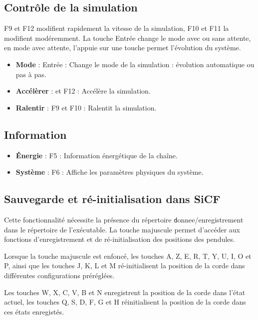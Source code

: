 \subsection{Contrôle de la simulation}
%
{\sf F9} et {\sf F12} modifient rapidement la vitesse de la simulation, {\sf F10} et {\sf F11} la modifient modéremment. La touche {\sf Entrée} change le mode avec ou sans attente, en mode avec attente, l'appuie sur une touche permet l'évolution du système.
%
\begin{itemize}[label=, leftmargin=2cm, itemsep=0pt]
\item {\bf Mode} : {\sf Entrée} : Change le mode de la simulation : évolution automatique ou pas à pas.
\item {\bf Accélèrer} : {} et {\sf F12} : Accélère la simulation.
\item {\bf Ralentir} : {\sf F9} et {\sf F10} : Ralentit la simulation.
\end{itemize}
%
%
\subsection{Information}
\begin{itemize}[label=, leftmargin=2cm, itemsep=0pt]
\item {\bf Énergie} : {\sf F5} : Information énergétique de la chaîne.
\item {\bf Système} : {\sf F6} : Affiche les paramètres physiques du système.
\end{itemize}
%
\subsection{Sauvegarde et ré-initialisation dans SiCF}
%
Cette fonctionnalité nécessite la présence du répertoire {\texttt donnee/enregistrement} dans le répertoire de l'exécutable.
La touche majuscule permet d'accéder aux fonctions d'enregistrement et de ré-initialisation des positions des pendules.

Lorsque la touche majuscule est enfoncé, les touches {\sf A}, {\sf Z}, {\sf E}, {\sf R}, {\sf T}, {\sf Y}, {\sf U}, {\sf I}, {\sf O} et {\sf P}, ainsi que les touches {\sf J}, {\sf K}, {\sf L} et {\sf M} ré-initialisent la position de la corde dans différentes configurations préréglées.

Les touches {\sf W}, {\sf X}, {\sf C}, {\sf V}, {\sf B} et {\sf N} enregistrent la position de la corde dans l'état actuel, les touches {\sf Q}, {\sf S}, {\sf D}, {\sf F}, {\sf G} et {\sf H} réinitialisent la position de la corde dans ces états enregistés.
%

